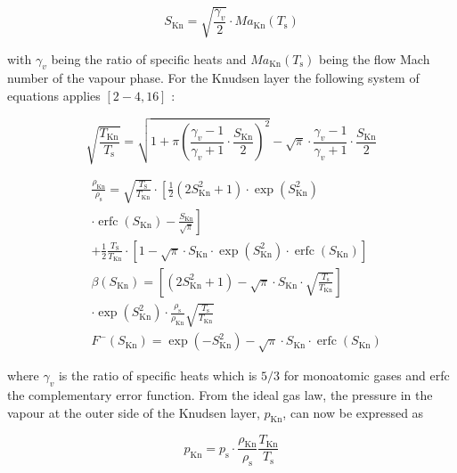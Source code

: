 \documentclass[10pt]{article}
\begin{document}
\begin{equation*}
S_{\mathrm{Kn}}=\sqrt{\frac{\gamma_{v}}{2}} \cdot M a_{\mathrm{Kn}}\left(T_{\mathrm{s}}\right) \tag{A1}
\end{equation*}


with $\gamma_{v}$ being the ratio of specific heats and $M a_{\mathrm{Kn}}\left(T_{\mathrm{s}}\right)$ being the flow Mach number of the vapour phase. For the Knudsen layer the following system of equations applies $[2-4,16]$ :


\begin{equation*}
\sqrt{\frac{T_{\mathrm{Kn}}}{T_{\mathrm{s}}}}=\sqrt{1+\pi\left(\frac{\gamma_{v}-1}{\gamma_{v}+1} \cdot \frac{S_{\mathrm{Kn}}}{2}\right)^{2}}-\sqrt{\pi} \cdot \frac{\gamma_{v}-1}{\gamma_{v}+1} \cdot \frac{S_{\mathrm{Kn}}}{2} \tag{A2}
\end{equation*}


$$
\begin{aligned}
& \frac{\rho_{\mathrm{Kn}}}{\rho_{\mathrm{s}}}=\sqrt{\frac{T_{\mathrm{S}}}{T_{\mathrm{Kn}}}} \cdot\left[\frac{1}{2}\left(2 S_{\mathrm{Kn}}^{2}+1\right) \cdot \exp \left(S_{\mathrm{Kn}}^{2}\right)\right. \\
& \left.\cdot \operatorname{erfc}\left(S_{\mathrm{Kn}}\right)-\frac{S_{\mathrm{Kn}}}{\sqrt{\pi}}\right] \\
& +\frac{1}{2} \frac{T_{\mathrm{S}}}{T_{\mathrm{Kn}}} \cdot\left[1-\sqrt{\pi} \cdot S_{\mathrm{Kn}} \cdot \exp \left(S_{\mathrm{Kn}}^{2}\right) \cdot \operatorname{erfc}\left(S_{\mathrm{Kn}}\right)\right] \\
& \beta\left(S_{\mathrm{Kn}}\right)=\left[\left(2 S_{\mathrm{Kn}}^{2}+1\right)-\sqrt{\pi} \cdot S_{\mathrm{Kn}} \cdot \sqrt{\frac{T_{\mathrm{s}}}{T_{\mathrm{Kn}}}}\right] \\
& \cdot \exp \left(S_{\mathrm{Kn}}^{2}\right) \cdot \frac{\rho_{\mathrm{s}}}{\rho_{\mathrm{Kn}}} \sqrt{\frac{T_{\mathrm{s}}}{T_{\mathrm{Kn}}}} \\
& F^{-}\left(S_{\mathrm{Kn}}\right)=\exp \left(-S_{\mathrm{Kn}}^{2}\right)-\sqrt{\pi} \cdot S_{\mathrm{Kn}} \cdot \operatorname{erfc}\left(S_{\mathrm{Kn}}\right)
\end{aligned}
$$

where $\gamma_{v}$ is the ratio of specific heats which is $5 / 3$ for monoatomic gases and erfc the complementary error function. From the ideal gas law, the pressure in the vapour at the outer side of the Knudsen layer, $p_{\mathrm{Kn}}$, can now be expressed as


\begin{equation*}
p_{\mathrm{Kn}}=p_{\mathrm{s}} \cdot \frac{\rho_{\mathrm{Kn}}}{\rho_{\mathrm{s}}} \frac{T_{\mathrm{Kn}}}{T_{\mathrm{s}}} \tag{A6}
\end{equation*}
\end{document}
